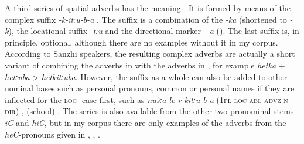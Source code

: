 A third series of spatial adverbs has the meaning . It is formed by means of the complex suffix \textit{-k-itːu-b-a} . The suffix is a combination of the  \textit{-ka} (shortened to \textit{-k}), the locational suffix \textit{-tːu} and the directional marker \textit{--a} (). The last suffix is, in principle, optional, although there are no examples without it in my corpus. According to Sanzhi speakers, the resulting complex adverbs are actually a short variant of combining the adverbs in  with the adverbs in , for example \textit{hetka} + \textit{hetːuba} > \textit{hetkitːuba}. However, the suffix as a whole can also be added to other nominal bases such as personal pronouns, common  or personal names if they are inflected for the \textsc{loc}- case first, such as \textit{nušːa-le-r-kitːu-b-a} (1\textsc{pl}-\textsc{loc}-\textsc{abl}-\textsc{advz}-\textsc{n}-\textsc{dir}) ,  (school) . The series is also available from the other two pronominal stems \textit{iC} and \textit{hiC}, but in my corpus there are only examples of the adverbs from the \textit{heC}-pronouns given in , , .

